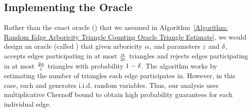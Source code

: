 








\subsection{Implementing the Oracle}
\label{ssec:oracle-implement}
Rather than the exact oracle (\exactheavyoracle) that we assumed in Algorithm~\ref{Algorithm: Random Edge Arboricity Triangle Counting Oracle Triangle Estimate}, we would design an oracle (called \heavyoracle) that given arboricity $\alpha$, and parameters $\varepsilon$ and $\delta$, accepts edges participating in at most $\frac{\alpha}{2\varepsilon}$ triangles and rejects edges participating in at most $\frac{2\alpha}{\varepsilon}$ triangles with probability $1 - \delta$. The algorithm works by estimating the number of triangles each edge participates in. However, in this case, each \neighbourq{} and \edgeexistsq{} generates i.i.d. random variables. Thus, our analysis uses multiplicative Chernoff bound to obtain high probability guarantees for each individual edge.


